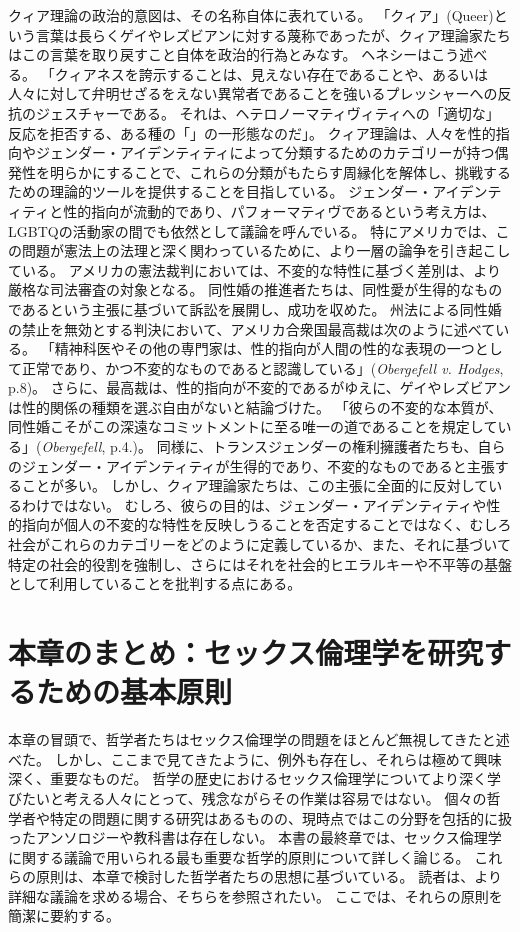 \documentclass[paper=a4,book,openany]{jlreq}
\begin{document}
クィア理論の政治的意図は、その名称自体に表れている。
「クィア」(Queer)という言葉は長らくゲイやレズビアンに対する蔑称であったが、クィア理論家たちはこの言葉を取り戻すこと自体を政治的行為とみなす。
ヘネシーはこう述べる。
「クィアネスを誇示することは、見えない存在であることや、あるいは人々に対して弁明せざるをえない異常者であることを強いるプレッシャーへの反抗のジェスチャーである。
それは、ヘテロノーマティヴィティへの「適切な」反応を拒否する、ある種の「」の一形態なのだ」\citep[p.867]{hennessy93:_queer_theor}。
クィア理論は、人々を性的指向やジェンダー・アイデンティティによって分類するためのカテゴリーが持つ偶発性を明らかにすることで、これらの分類がもたらす周縁化を解体し、挑戦するための理論的ツールを提供することを目指している。
ジェンダー・アイデンティティと性的指向が流動的であり、パフォーマティヴであるという考え方は、LGBTQの活動家の間でも依然として議論を呼んでいる。
特にアメリカでは、この問題が憲法上の法理と深く関わっているために、より一層の論争を引き起こしている。
アメリカの憲法裁判においては、不変的な特性に基づく差別は、より厳格な司法審査の対象となる。
同性婚の推進者たちは、同性愛が生得的なものであるという主張に基づいて訴訟を展開し、成功を収めた。
州法による同性婚の禁止を無効とする判決において、アメリカ合衆国最高裁は次のように述べている。
「精神科医やその他の専門家は、性的指向が人間の性的な表現の一つとして正常であり、かつ不変的なものであると認識している」(\emph{Obergefell v. Hodges}, p.8)。
さらに、最高裁は、性的指向が不変的であるがゆえに、ゲイやレズビアンは性的関係の種類を選ぶ自由がないと結論づけた。
「彼らの不変的な本質が、同性婚こそがこの深遠なコミットメントに至る唯一の道であることを規定している」(\emph{Obergefell}, p.4.)。
同様に、トランスジェンダーの権利擁護者たちも、自らのジェンダー・アイデンティティが生得的であり、不変的なものであると主張することが多い。
しかし、クィア理論家たちは、この主張に全面的に反対しているわけではない。
むしろ、彼らの目的は、ジェンダー・アイデンティティや性的指向が個人の不変的な特性を反映しうることを否定することではなく、むしろ社会がこれらのカテゴリーをどのように定義しているか、また、それに基づいて特定の社会的役割を強制し、さらにはそれを社会的ヒエラルキーや不平等の基盤として利用していることを批判する点にある。

\section{本章のまとめ：セックス倫理学を研究するための基本原則}

本章の冒頭で、哲学者たちはセックス倫理学の問題をほとんど無視してきたと述べた。
しかし、ここまで見てきたように、例外も存在し、それらは極めて興味深く、重要なものだ。
哲学の歴史におけるセックス倫理学についてより深く学びたいと考える人々にとって、残念ながらその作業は容易ではない。
個々の哲学者や特定の問題に関する研究はあるものの、現時点ではこの分野を包括的に扱ったアンソロジーや教科書は存在しない。
本書の最終章では、セックス倫理学に関する議論で用いられる最も重要な哲学的原則について詳しく論じる。
これらの原則は、本章で検討した哲学者たちの思想に基づいている。
読者は、より詳細な議論を求める場合、そちらを参照されたい。
ここでは、それらの原則を簡潔に要約する。
\end{document}
